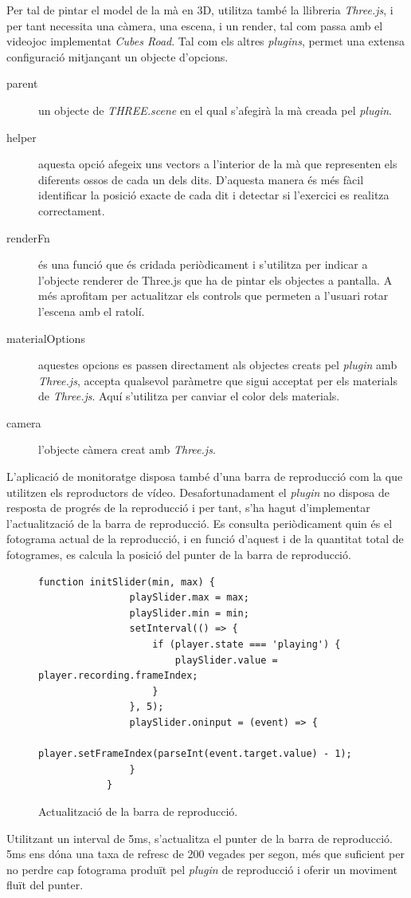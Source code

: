 \documentclass[12pt,a4paper,catalan]{article}
\begin{document}
	Per tal de pintar el model de la mà en 3D, utilitza també la llibreria \textit{Three.js}, i per tant necessita una càmera, una escena, i un render, tal com passa amb el videojoc implementat \textit{Cubes Road}. Tal com els altres \textit{plugins}, permet una extensa configuració mitjançant un objecte d'opcions.
	\begin{description}
		\item[parent] un objecte de \textit{THREE.scene} en el qual s'afegirà la mà creada pel \textit{plugin}.
		\item[helper] aquesta opció afegeix uns vectors a l'interior de la mà que representen els diferents ossos de cada un dels dits. D'aquesta manera és més fàcil identificar la posició exacte de cada dit i detectar si l'exercici es realitza correctament.
		\item[renderFn] és una funció que és cridada periòdicament i s'utilitza per indicar a l'objecte renderer de Three.js que ha de pintar els objectes a pantalla. A més aprofitam per actualitzar els controls que permeten a l'usuari rotar l'escena amb el ratolí.
		\item[materialOptions] aquestes opcions es passen directament als objectes creats pel \textit{plugin} amb \textit{Three.js}, accepta qualsevol paràmetre que sigui acceptat per els materials de \textit{Three.js}. Aquí s'utilitza per canviar el color dels materials.
		\item[camera] l'objecte càmera creat amb \textit{Three.js}.
	\end{description}
	L'aplicació de monitoratge disposa també d'una barra de reproducció com la que utilitzen els reproductors de vídeo. Desafortunadament el \textit{plugin} no disposa de resposta de progrés de la reproducció i per tant, s'ha hagut d'implementar l'actualització de la barra de reproducció. Es consulta periòdicament quin és el fotograma actual de la reproducció, i en funció d'aquest i de la quantitat total de fotogrames, es calcula la posició del punter de la barra de reproducció.
	\begin{figure}[H]
		\begin{lstlisting}[gobble=12, tabsize=4]
			function initSlider(min, max) {
				playSlider.max = max;
				playSlider.min = min;
				setInterval(() => {
					if (player.state === 'playing') {
						playSlider.value = player.recording.frameIndex;
					}
				}, 5);
				playSlider.oninput = (event) => {
					player.setFrameIndex(parseInt(event.target.value) - 1);
				}
			}
		\end{lstlisting}
		\caption{Actualització de la barra de reproducció.}
		\label{fig:monitoring-slider}
	\end{figure}
	Utilitzant un interval de 5ms, s'actualitza el punter de la barra de reproducció. 5ms ens dóna una taxa de refresc de 200 vegades per segon, més que suficient per no perdre cap fotograma produït pel \textit{plugin} de reproducció i oferir un  moviment fluït del punter.
\end{document}
